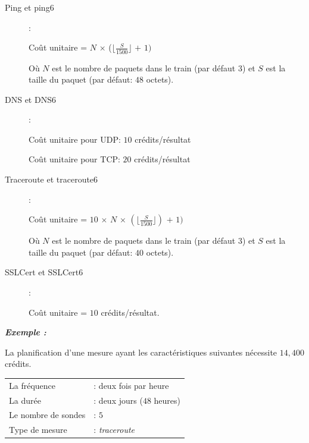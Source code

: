 \begin{description}
	\item[Ping et ping6 ]  :
	\begin{tcolorbox}
		\begin{center}
			Coût unitaire = $N$ $\times$ ($\lfloor \frac{S}{1500} \rfloor $ $+$ $1)$
		\end{center}
	\end{tcolorbox}
	
	Où $N$ est le nombre de paquets dans le train (par défaut $3$) et $S$ est la taille du paquet (par défaut: $48$ octets).
	
	\item[DNS et DNS6 ] :
	
	\begin{tcolorbox}
		\begin{center}
			Coût unitaire pour UDP: $10$ crédits/résultat
			
			Coût unitaire pour TCP: $20$ crédits/résultat
		\end{center}
	\end{tcolorbox}
	
	
	\item[Traceroute et traceroute6 ] :
	
	\begin{tcolorbox}
		\begin{center}
			Coût unitaire = $10$ $\times$ $N$ $\times$ $(\lfloor \frac{S}{1500}\rfloor)$ $+$ $1)$
		\end{center}
	\end{tcolorbox}
	
	Où $N$ est le nombre de paquets dans le train (par défaut $3$) et $S$ est la taille du paquet (par défaut: $40$ octets).
	
	\item[SSLCert et SSLCert6 ] :
	
	\begin{tcolorbox}
		\begin{center}
			Coût unitaire = $10$ crédits/résultat.
		\end{center}
	\end{tcolorbox}	
	
\end{description}

\textbf{\textit{Exemple :}}

La planification d'une mesure ayant les caractéristiques suivantes nécessite $14,400$ crédits.

\begin{table}[H]
	\begin{tabular}{ l l }
		La fréquence &: deux fois par heure \\ 
		
		La durée &: deux jours ($48$ heures) \\
		
		Le nombre de sondes&: $5$\\
		
		Type de mesure &: \textit{traceroute}\\
	\end{tabular}
\end{table}

